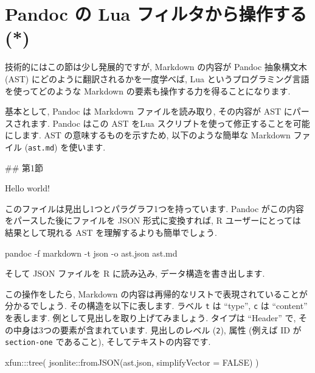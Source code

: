 \documentclass[
  11pt,
  lualatex,
  ja=standard]{bxjsreport}
\newenvironment{Shaded}{\begin{snugshade}}{\end{snugshade}}
\newcommand{\AttributeTok}[1]{\textcolor[rgb]{0.77,0.63,0.00}{#1}}
\newcommand{\ConstantTok}[1]{\textcolor[rgb]{0.00,0.00,0.00}{#1}}
\newcommand{\ExtensionTok}[1]{#1}
\newcommand{\FunctionTok}[1]{\textcolor[rgb]{0.00,0.00,0.00}{#1}}
\newcommand{\NormalTok}[1]{#1}
\newcommand{\SpecialCharTok}[1]{\textcolor[rgb]{0.00,0.00,0.00}{#1}}
\newcommand{\StringTok}[1]{\textcolor[rgb]{0.31,0.60,0.02}{#1}}
\begin{document}
\hypertarget{lua-filters}{%
\section{Pandoc の Lua フィルタから操作する (*)}\label{lua-filters}}


技術的にはこの節は少し発展的ですが, Markdown の内容が Pandoc 抽象構文木 (AST) にどのように翻訳されるかを一度学べば, Lua というプログラミング言語を使ってどのような Markdown の要素も操作する力を得ることになります.

基本として, Pandoc は Markdown ファイルを読み取り, その内容が AST にパースされます. Pandoc はこの AST をLua スクリプトを使って修正することを可能にします. AST の意味するものを示すため, 以下のような簡単な Markdown ファイル (\texttt{ast.md}) を使います.

\begin{Shaded}
\begin{Highlighting}[numbers=left,,]
\FunctionTok{\#\# 第1節}

\NormalTok{Hello world!}
\end{Highlighting}
\end{Shaded}

このファイルは見出し1つとパラグラフ1つを持っています. Pandoc がこの内容をパースした後にファイルを JSON 形式に変換すれば, R ユーザーにとっては 結果として現れる AST を理解するよりも簡単でしょう.

\begin{Shaded}
\begin{Highlighting}[numbers=left,,]
\ExtensionTok{pandoc} \AttributeTok{{-}f}\NormalTok{ markdown }\AttributeTok{{-}t}\NormalTok{ json }\AttributeTok{{-}o}\NormalTok{ ast.json ast.md}
\end{Highlighting}
\end{Shaded}

そして JSON ファイルを R に読み込み, データ構造を書き出します.

この操作をしたら, Markdown の内容は再帰的なリストで表現されていることが分かるでしょう. その構造を以下に表します. ラベル \texttt{t} は ``type'', \texttt{c} は ``content'' を表します. 例として見出しを取り上げてみましょう. タイプは ``Header'' で, その中身は3つの要素が含まれています. 見出しのレベル (\texttt{2}), 属性 (例えば ID が \texttt{section-one} であること), そしてテキストの内容です.

\begin{Shaded}
\begin{Highlighting}[numbers=left,,]
\NormalTok{xfun}\SpecialCharTok{:::}\FunctionTok{tree}\NormalTok{(}
\NormalTok{  jsonlite}\SpecialCharTok{::}\FunctionTok{fromJSON}\NormalTok{(}\StringTok{\textquotesingle{}ast.json\textquotesingle{}}\NormalTok{, }\AttributeTok{simplifyVector =} \ConstantTok{FALSE}\NormalTok{)}
\NormalTok{)}
\end{Highlighting}
\end{Shaded}
\end{document}
